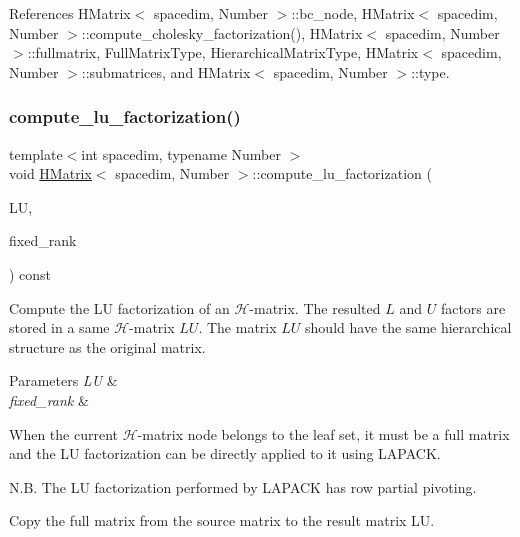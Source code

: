 References H\+Matrix$<$ spacedim, Number $>$\+::bc\+\_\+node, H\+Matrix$<$ spacedim, Number $>$\+::compute\+\_\+cholesky\+\_\+factorization(), H\+Matrix$<$ spacedim, Number $>$\+::fullmatrix, Full\+Matrix\+Type, Hierarchical\+Matrix\+Type, H\+Matrix$<$ spacedim, Number $>$\+::submatrices, and H\+Matrix$<$ spacedim, Number $>$\+::type.

\mbox{\label{classHMatrix_acf95fce81ec83a759d1db8d10c3e34fb}} 
\subsubsection{\texorpdfstring{compute\+\_\+lu\+\_\+factorization()}{compute\_lu\_factorization()}\hspace{0.1cm}{\footnotesize\ttfamily [1/2]}}
{\footnotesize\ttfamily template$<$int spacedim, typename Number $>$ \\
void \hyperlink{classHMatrix}{H\+Matrix}$<$ spacedim, Number $>$\+::compute\+\_\+lu\+\_\+factorization (\begin{DoxyParamCaption}\item[{\hyperlink{classHMatrix}{H\+Matrix}$<$ spacedim, Number $>$ \&}]{LU,  }\item[{const unsigned int}]{fixed\+\_\+rank }\end{DoxyParamCaption}) const}

Compute the LU factorization of an $\mathcal{H}$-\/matrix. The resulted $L$ and $U$ factors are stored in a same $\mathcal{H}$-\/matrix $LU$. The matrix $LU$ should have the same hierarchical structure as the original matrix.


\begin{DoxyParams}{Parameters}
{\em LU} & \\
\hline
{\em fixed\+\_\+rank} & \\
\hline
\end{DoxyParams}
When the current $\mathcal{H}$-\/matrix node belongs to the leaf set, it must be a full matrix and the LU factorization can be directly applied to it using L\+A\+P\+A\+CK.

N.\+B. The LU factorization performed by L\+A\+P\+A\+CK has row partial pivoting.

Copy the full matrix from the source matrix to the result matrix {\ttfamily LU}.

